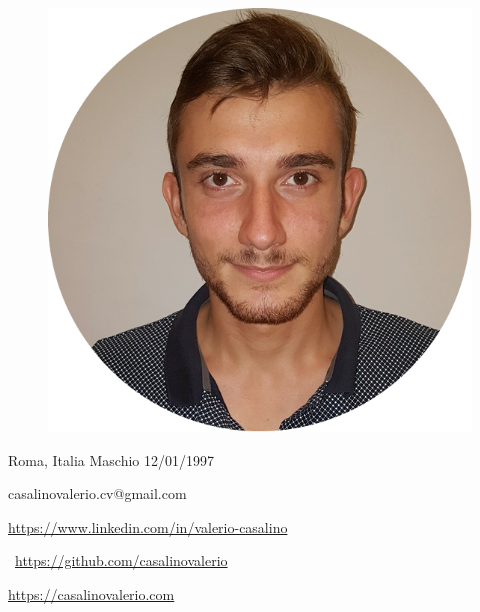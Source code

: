 \documentclass[12pt, openany, a4paper]{report}
\begin{document}
	
	\noindent\makebox[\linewidth]{\rule{\textwidth}{0.6pt}}
	
	\begin{minipage}{.3\textwidth}
		\begin{figure}[H]
			\centering
			\includegraphics[width=.9\textwidth]{fototessera}
		\end{figure}
	\end{minipage}
	\hfill
	\begin{minipage}{.65\textwidth}
	
			\vfill
			
			{\color{Sepia} \faMapMarker} Roma, Italia \hfill {\color{Sepia} \faMars} Maschio \hfill  {\color{Sepia} \faBirthdayCake } 12/01/1997
			
			\vfill
		
			{ \color{Salmon} \faEnvelope} casalinovalerio.cv@gmail.com
			
			\vfill

			{ \color{linkedinBlue} \faLinkedin} \url{https://www.linkedin.com/in/valerio-casalino}

			\vfill
			
			\faGithub \ \url{https://github.com/casalinovalerio}
			
			\vfill
			
			
			
			{ \color{Dandelion} \faChain } \url{https://casalinovalerio.com}
			
			\vfill
			
	\end{minipage}
\end{document}
